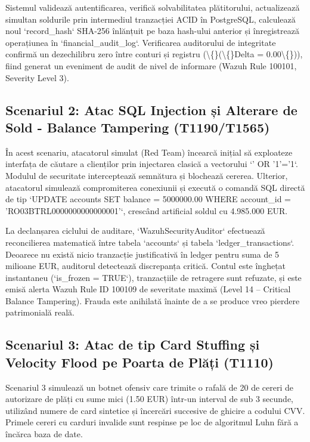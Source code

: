 Sistemul validează autentificarea, verifică solvabilitatea plătitorului, actualizează simultan soldurile prin intermediul tranzacției ACID în PostgreSQL, calculează noul `record\_hash` SHA-256 înlănțuit pe baza hash-ului anterior și înregistrează operațiunea în `financial\_audit\_log`. Verificarea auditorului de integritate confirmă un dezechilibru zero între conturi și registru (\textbackslash\{\}(\textbackslash\{\}Delta = 0.00\textbackslash\{\})), fiind generat un eveniment de audit de nivel de informare (Wazuh Rule 100101, Severity Level 3).

\subsection{Scenariul 2: Atac SQL Injection și Alterare de Sold - Balance Tampering (T1190/T1565)}

În acest scenariu, atacatorul simulat (Red Team) încearcă inițial să exploateze interfața de căutare a clienților prin injectarea clasică a vectorului `' OR '1'='1`. Modulul de securitate interceptează semnătura și blochează cererea. Ulterior, atacatorul simulează compromiterea conexiunii și execută o comandă SQL directă de tip `UPDATE accounts SET balance = 5000000.00 WHERE account\_id = 'RO03BTRL0000000000000001'`, crescând artificial soldul cu 4.985.000 EUR.

La declanșarea ciclului de auditare, `WazuhSecurityAuditor` efectuează reconcilierea matematică între tabela `accounts` și tabela `ledger\_transactions`. Deoarece nu există nicio tranzacție justificativă în ledger pentru suma de 5 milioane EUR, auditorul detectează discrepanța critică. Contul este înghețat instantaneu (`is\_frozen = TRUE`), tranzacțiile de retragere sunt refuzate, și este emisă alerta Wazuh Rule ID 100109 de severitate maximă (Level 14 – Critical Balance Tampering). Frauda este anihilată înainte de a se produce vreo pierdere patrimonială reală.

\subsection{Scenariul 3: Atac de tip Card Stuffing și Velocity Flood pe Poarta de Plăți (T1110)}

Scenariul 3 simulează un botnet ofensiv care trimite o rafală de 20 de cereri de autorizare de plăți cu sume mici (1.50 EUR) într-un interval de sub 3 secunde, utilizând numere de card sintetice și încercări succesive de ghicire a codului CVV. Primele cereri cu carduri invalide sunt respinse pe loc de algoritmul Luhn fără a încărca baza de date.

